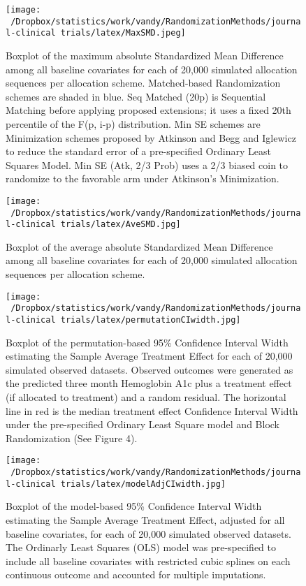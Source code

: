 \documentclass[12pt,oneside]{book}
\newlength{\li}\setlength{\li}{14.48pt}
\newlength{\di}\setlength{\di}{-3.5mm}
\theoremstyle{definition}
\theoremstyle{definition}
\theoremstyle{definition}
\theoremstyle{remark}
\begin{document}
\begin{figure}
\centering
\texttt{[image: ~/Dropbox/statistics/work/vandy/RandomizationMethods/journal-clinical trials/latex/MaxSMD.jpeg]}
\caption{\label{fig:MaxSMD}Boxplot of the maximum absolute Standardized Mean
Difference among all baseline covariates for each of 20,000 simulated
allocation sequences per allocation scheme. Matched-based Randomization
schemes are shaded in blue. Seq Matched (20p) is Sequential Matching
before applying proposed extensions; it uses a fixed 20th percentile of
the F(p, i-p) distribution. Min SE schemes are Minimization schemes
proposed by Atkinson and Begg and Iglewicz to reduce the standard error
of a pre-specified Ordinary Least Squares Model. Min SE (Atk, 2/3 Prob)
uses a 2/3 biased coin to randomize to the favorable arm under
Atkinson's Minimization.}
\end{figure}

\begin{figure}
\centering
\texttt{[image: ~/Dropbox/statistics/work/vandy/RandomizationMethods/journal-clinical trials/latex/AveSMD.jpg]}
\caption{\label{fig:AveSMD}Boxplot of the average absolute Standardized Mean
Difference among all baseline covariates for each of 20,000 simulated
allocation sequences per allocation scheme.}
\end{figure}

\begin{figure}
\centering
\texttt{[image: ~/Dropbox/statistics/work/vandy/RandomizationMethods/journal-clinical trials/latex/permutationCIwidth.jpg]}
\caption{\label{fig:permCIwidth}Boxplot of the permutation-based 95\%
Confidence Interval Width estimating the Sample Average Treatment Effect
for each of 20,000 simulated observed datasets. Observed outcomes were
generated as the predicted three month Hemoglobin A1c plus a treatment
effect (if allocated to treatment) and a random residual. The horizontal
line in red is the median treatment effect Confidence Interval Width
under the pre-specified Ordinary Least Square model and Block
Randomization (See Figure 4).}
\end{figure}

\begin{figure}
\centering
\texttt{[image: ~/Dropbox/statistics/work/vandy/RandomizationMethods/journal-clinical trials/latex/modelAdjCIwidth.jpg]}
\caption{\label{fig:adjCIwidth}Boxplot of the model-based 95\% Confidence
Interval Width estimating the Sample Average Treatment Effect, adjusted
for all baseline covariates, for each of 20,000 simulated observed
datasets. The Ordinarly Least Squares (OLS) model was pre-specified to
include all baseline covariates with restricted cubic splines on each
continuous outcome and accounted for multiple imputations.}
\end{figure}
\end{document}
